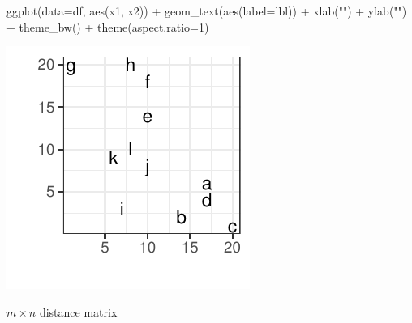 \documentclass[a4paper]{article}\usepackage[]{graphicx}\usepackage[]{xcolor}
\makeatletter
\def\maxwidth{ %
  \ifdim\Gin@nat@width>\linewidth
    \linewidth
  \else
    \Gin@nat@width
  \fi
}
\makeatother
\begin{document}
\hspace{0.02\textwidth}
\begin{minipage}[t]{0.49\textwidth}
\begin{Schunk}
\begin{Sinput}
ggplot(data=df, aes(x1, x2)) + geom_text(aes(label=lbl)) + 
  xlab("") + ylab("") + theme_bw() + 
  theme(aspect.ratio=1) 
\end{Sinput}


{\centering \includegraphics[width=\maxwidth]{figure/listings-unnamed-chunk-479-1} 

}

\end{Schunk}
\end{minipage}
\( m \times n \) distance matrix
\end{document}
